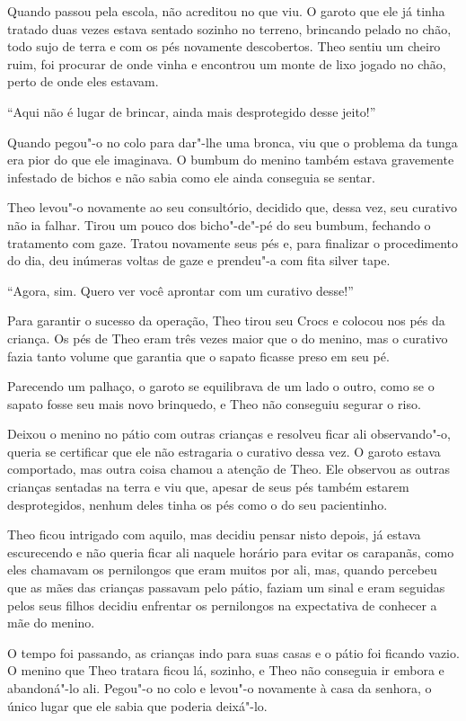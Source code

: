 Quando passou pela escola, não acreditou no que viu. O garoto que ele já
tinha tratado duas vezes estava sentado sozinho no terreno, brincando
pelado no chão, todo sujo de terra e com os pés novamente descobertos.
Theo sentiu um cheiro ruim, foi procurar de onde vinha e encontrou um
monte de lixo jogado no chão, perto de onde eles estavam.

``Aqui não é lugar de brincar, ainda mais desprotegido desse jeito!''

Quando pegou"-o no colo para dar"-lhe uma bronca, viu que o problema da
tunga era pior do que ele imaginava. O bumbum do menino também estava
gravemente infestado de bichos e não sabia como ele ainda conseguia se
sentar.

Theo levou"-o novamente ao seu consultório, decidido que, dessa vez, seu
curativo não ia falhar. Tirou um pouco dos bicho"-de"-pé do seu bumbum,
fechando o tratamento com gaze. Tratou novamente seus pés e, para
finalizar o procedimento do dia, deu inúmeras voltas de gaze e prendeu"-a
com fita silver tape.

``Agora, sim. Quero ver você aprontar com um curativo desse!''

Para garantir o sucesso da operação, Theo tirou seu Crocs e colocou nos
pés da criança. Os pés de Theo eram três vezes maior que o do menino,
mas o curativo fazia tanto volume que garantia que o sapato ficasse
preso em seu pé.

Parecendo um palhaço, o garoto se equilibrava de um lado o outro, como
se o sapato fosse seu mais novo brinquedo, e Theo não conseguiu segurar
o riso.

Deixou o menino no pátio com outras crianças e resolveu ficar ali
observando"-o, queria se certificar que ele não estragaria o curativo
dessa vez. O garoto estava comportado, mas outra coisa chamou a atenção
de Theo. Ele observou as outras crianças sentadas na terra e viu que,
apesar de seus pés também estarem desprotegidos, nenhum deles tinha os
pés como o do seu pacientinho.

Theo ficou intrigado com aquilo, mas decidiu pensar nisto depois, já
estava escurecendo e não queria ficar ali naquele horário para evitar os
carapanãs, como eles chamavam os pernilongos que eram muitos por ali,
mas, quando percebeu que as mães das crianças passavam pelo pátio,
faziam um sinal e eram seguidas pelos seus filhos decidiu enfrentar os
pernilongos na expectativa de conhecer a mãe do menino.

O tempo foi passando, as crianças indo para suas casas e o pátio foi
ficando vazio. O menino que Theo tratara ficou lá, sozinho, e Theo não
conseguia ir embora e abandoná"-lo ali. Pegou"-o no colo e levou"-o
novamente à casa da senhora, o único lugar que ele sabia que poderia
deixá"-lo.

